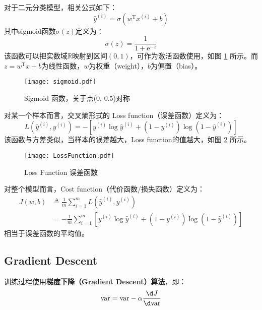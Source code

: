 对于二元分类模型，相关公式如下：
\begin{equation}
    \hat{y}^{(i)} = \sigma(w^\mathrm{T} x^{(i)} + b) \label{eq:logistic}
\end{equation}
其中sigmoid函数$\sigma(z)$定义为：
\begin{equation}
    \sigma(z) = \frac{1}{1 + \mathrm{e}^{-z}} \label{eq:sigmoid}
\end{equation}
该函数可以把实数域$\mathbb{R}$映射到区间$(0, 1)$，可作为激活函数使用，如图 \ref{fig:sigmoid} 所示。而$z = w^\mathrm{T} x + b$为线性函数，$w$为权重（weight），$b$为偏置（bias）。
\begin{figure}[h!b]
    \centering
    \texttt{[image: sigmoid.pdf]}
    \caption{Sigmoid 函数，关于点(0, 0.5)对称}
    \label{fig:sigmoid}
\end{figure}

对某一个样本而言，交叉熵形式的 Loss function（误差函数）定义为：
\begin{equation}
    L(\hat{y}^{(i)}, y^{(i)}) = -\left[y^{(i)} \log \hat{y}^{(i)} + (1 - y^{(i)}) \log (1 - \hat{y}^{(i)})\right] \label{eq:loss}
\end{equation}
该函数与方差类似，当样本的误差越大，Loss function的值越大，如图 \ref{fig:loss} 所示。
\begin{figure}[h!b]
    \centering
    \texttt{[image: LossFunction.pdf]}
    \caption{Loss Function 误差函数}
    \label{fig:loss}
\end{figure}

对整个模型而言，Cost function（代价函数/损失函数）定义为：
\begin{equation}
    \begin{aligned}
        J(w, b) &\triangleq  \frac{1}{m} \sum_{i=1}^{m} L(\hat{y}^{(i)}, y^{(i)}) \\
        &= -\frac{1}{m} \sum_{i=1}^{m} \left[y^{(i)} \log \hat{y}^{(i)} + (1 - y^{(i)}) \log (1 - \hat{y}^{(i)})\right] \label{eq:cost}
    \end{aligned}
\end{equation}
相当于误差函数的平均值。

\subsection{Gradient Descent}

训练过程使用\textbf{梯度下降（Gradient Descent）算法}，即：
\begin{equation}
    \mathrm{var} = \mathrm{var} - \alpha \frac{\d J}{\d \mathrm{var}} \label{eq:gradient}
\end{equation}

